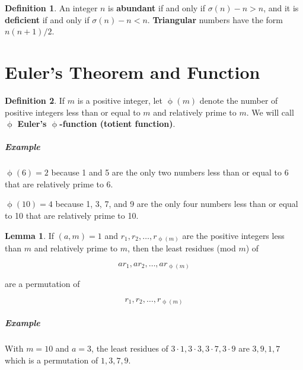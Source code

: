 \documentclass{article}
\theoremstyle{definition} %
\theoremstyle{definition}
\theoremstyle{definition}
\newtheorem{lemma}{Lemma}[section]
\newcommand{\tot}{\upphi}
\theoremstyle{definition}
\newtheorem{definition}{Definition}[section]
\begin{document}
  \begin{definition}
    An integer $n$ is \textbf{abundant} if and only if $\sigma(n) - n > n$, and it is
    \textbf{deficient} if and only if $\sigma(n) - n < n$. \textbf{Triangular} numbers
    have the form $n(n + 1)/2$.
  \end{definition}
  
  \section{Euler's Theorem and Function}
  
  \begin{definition}
    If $m$ is a positive integer, let $\tot(m)$ denote the number of positive integers
    less than or equal to $m$ and relatively prime to $m$. We will call $\tot$
    \textbf{Euler's $\tot$-function (totient function)}.
  \end{definition}
  
  \subparagraph{Example} $\tot(6) = 2$ because 1 and 5 are the only two numbers less than
  or equal to 6 that are relatively prime to 6.
  
  $\tot(10) = 4$ because 1, 3, 7, and 9 are the only four numbers less than
  or equal to 10 that are relatively prime to 10.
  
  \begin{lemma}
    If $(a, m) = 1$ and $r_1, r_2, \dots, r_{\tot(m)}$ are the positive integers less than $m$ and
    relatively prime to $m$, then the least residues (mod $m$) of
    
    \begin{equation}
      ar_1, ar_2, \dots, ar_{\tot(m)}
    \end{equation}
    
    are a permutation of
    
    \begin{equation*}
      r_1, r_2, \dots, r_{\tot(m)}
    \end{equation*}
  \end{lemma}
  
  \subparagraph{Example} With $m = 10$ and $a = 3$, the least residues of $3 \cdot 1,
  3 \cdot 3, 3 \cdot 7, 3 \cdot 9$ are $3, 9, 1, 7$ which is a permutation of $1, 3, 7, 9$.
  
\end{document}
